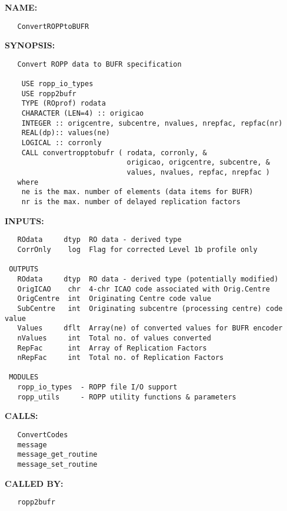 \label{ch:robo97}
\label{ch:ropp2bufr_ConvertROPPtoBUFR}
\textbf{NAME:}\hspace{0.08in}\begin{Verbatim}
   ConvertROPPtoBUFR
\end{Verbatim}
\textbf{SYNOPSIS:}\hspace{0.08in}\begin{Verbatim}
   Convert ROPP data to BUFR specification

    USE ropp_io_types
    USE ropp2bufr
    TYPE (ROprof) rodata
    CHARACTER (LEN=4) :: origicao
    INTEGER :: origcentre, subcentre, nvalues, nrepfac, repfac(nr)
    REAL(dp):: values(ne)
    LOGICAL :: corronly
    CALL convertropptobufr ( rodata, corronly, &
                             origicao, origcentre, subcentre, &
                             values, nvalues, repfac, nrepfac )
   where
    ne is the max. number of elements (data items for BUFR)
    nr is the max. number of delayed replication factors
\end{Verbatim}
\textbf{INPUTS:}\hspace{0.08in}\begin{Verbatim}
   ROdata     dtyp  RO data - derived type
   CorrOnly    log  Flag for corrected Level 1b profile only

 OUTPUTS
   ROdata     dtyp  RO data - derived type (potentially modified)
   OrigICAO    chr  4-chr ICAO code associated with Orig.Centre
   OrigCentre  int  Originating Centre code value
   SubCentre   int  Originating subcentre (processing centre) code value
   Values     dflt  Array(ne) of converted values for BUFR encoder
   nValues     int  Total no. of values converted
   RepFac      int  Array of Replication Factors
   nRepFac     int  Total no. of Replication Factors

 MODULES
   ropp_io_types  - ROPP file I/O support
   ropp_utils     - ROPP utility functions & parameters
\end{Verbatim}
\textbf{CALLS:}\hspace{0.08in}\begin{Verbatim}
   ConvertCodes
   message
   message_get_routine
   message_set_routine
\end{Verbatim}
\textbf{CALLED BY:}\hspace{0.08in}\begin{Verbatim}
   ropp2bufr
\end{Verbatim}
